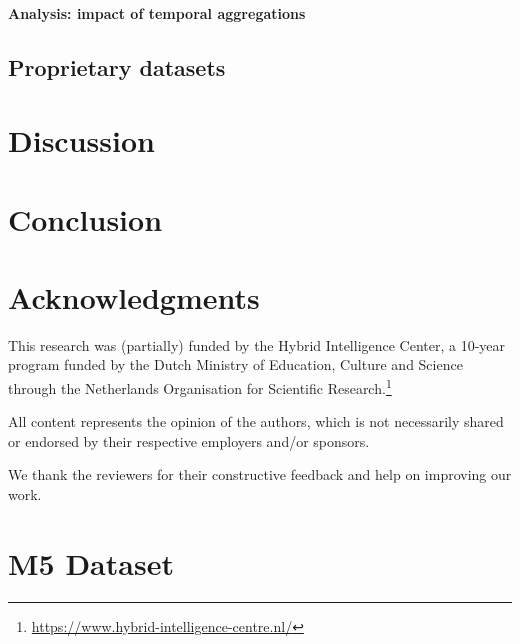 \documentclass[preprint, 3p, times, twocolumn]{elsarticle}
\begin{document}
  \paragraph{Analysis: impact of temporal aggregations}

  
  \subsection{Proprietary datasets}
    \label{subsec:proprietarydatasets}

\section{Discussion}
  \label{sec:discussion}


\section{Conclusion}
  \label{sec:conclusion}

\section*{Acknowledgments}
  This research was (partially) funded by the Hybrid Intelligence Center, a 10-year program funded by the Dutch Ministry of Education, Culture and Science through the Netherlands Organisation for Scientific Research.\footnote{\url{https://www.hybrid-intelligence-centre.nl/}}

  All content represents the opinion of the authors, which is not necessarily shared or endorsed by their respective employers and/or sponsors.
  
  We thank the reviewers for their constructive feedback and help on improving our work. 


 


\clearpage

\appendix

\section{M5 Dataset} \label{app:m5dataset}
\end{document}
